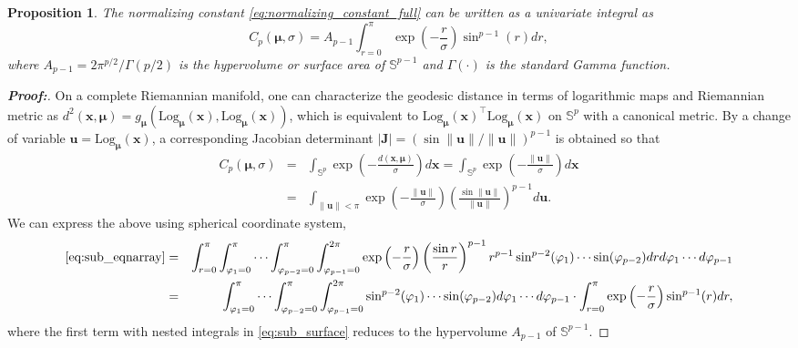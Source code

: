 \documentclass[10pt]{article}
\newtheorem{proposition}[theorem]{Proposition}
\newcommand{\Log}{\textrm{Log}}
\newcommand{\bfu}{\mathbf{u}}
\newcommand{\bfx}{\mathbf{x}}
\newcommand{\bfmu}{\boldsymbol{\mu}}
\newcommand{\bbS}{\mathbb{S}}
\begin{document}
\begin{proposition}\label{theory_proposition} The normalizing constant \eqref{eq:normalizing_constant_full} can be written as a univariate integral as
	\begin{equation}\label{eq:normalizing_constant_simplified}
	C_p (\bfmu, \sigma) = A_{p-1} \int_{r=0}^\pi \exp \left( -\frac{r}{\sigma}\right) \sin^{p-1} (r)dr,
	\end{equation}
	where $A_{p-1} = 2\pi^{p/2} / \Gamma(p/2)$ is the hypervolume or surface area of $\bbS^{p-1}$ and $\Gamma(\cdot)$ is the standard Gamma function. 
\end{proposition}
\begin{proof}[\textbf{\upshape Proof:}]
	On a complete Riemannian manifold, one can characterize the geodesic distance in terms of logarithmic maps and Riemannian metric as $d^2(\bfx, \bfmu) = g_{\bfmu} (\Log_{\bfmu} (\bfx), \Log_{\bfmu} (\bfx))$, which is equivalent to $\Log_{\bfmu} (\bfx)^\top \Log_{\bfmu} (\bfx)$ on $\bbS^p$ with a canonical metric. By a change of variable $\bfu = \Log_{\bfmu} (\bfx)$, a corresponding Jacobian determinant $|\mathbf{J}| = (\sin \|\bfu\| / \|\bfu\|)^{p-1}$ is obtained so that
	\begin{eqnarray}
	C_p (\bfmu, \sigma) &=& \int_{\bbS^p}  \exp \left( -\frac{d(\bfx, \bfmu)}{\sigma} \right) d\bfx =  \int_{\bbS^p}  \exp \left( -\frac{\|\bfu\|}{\sigma}\right) d\bfx \nonumber \\  &=& \int_{\|\bfu \| < \pi} \exp \left( -\frac{\|\bfu\|}{\sigma}\right) \left(\frac{\sin \|\bfu \|}{\|\bfu\|}\right)^{p-1} d\bfu. \label{eq:sub_eqnarray}
	\end{eqnarray}
	We can express the above using spherical coordinate system,
	\begin{eqnarray}
	\eqref{eq:sub_eqnarray} &=& \int_{r=0}^\pi \int_{\varphi_1=0}^\pi \cdots \int_{\varphi_{p-2}=0}^\pi \int_{\varphi_{p-1}=0}^{2\pi} \exp \left(-\frac{r}{\sigma}\right) \left(\frac{\sin r}{r}\right)^{p-1} r^{p-1} \sin^{p-2} (\varphi_1)  \cdots \sin (\varphi_{p-2}) dr d\varphi_1 \cdots d\varphi_{p-1} \nonumber \\
	&=& \int_{\varphi_1=0}^\pi \cdots \int_{\varphi_{p-2}=0}^\pi \int_{\varphi_{p-1}=0}^{2\pi}\sin^{p-2} (\varphi_1)  \cdots \sin (\varphi_{p-2})  d\varphi_1 \cdots d\varphi_{p-1}		 \cdot 
	\int_{r=0}^\pi \exp \left(-\frac{r}{\sigma}\right) \sin^{p-1}(r)dr,\label{eq:sub_surface}
	\end{eqnarray}
	where the first term with nested integrals in \eqref{eq:sub_surface} reduces to the hypervolume $A_{p-1}$ of $\bbS^{p-1}$. 
\end{proof}
\end{document}

